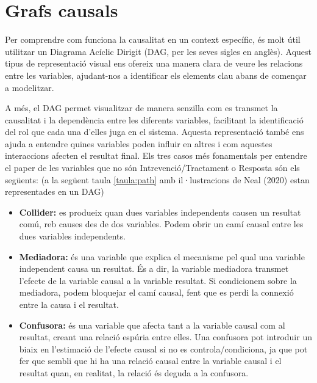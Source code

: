 \documentclass[../main.tex]{subfiles}
\begin{document}
    
    \section{Grafs causals}\label{sec:dag}
    Per comprendre com funciona la causalitat en un context específic, és molt útil utilitzar un Diagrama Acíclic Dirigit (DAG, per les seves sigles en anglès). Aquest tipus de representació visual ens ofereix una manera clara de veure les relacions entre les variables, ajudant-nos a identificar els elements clau abans de començar a modelitzar. \par
    A més, el DAG permet visualitzar de manera senzilla com es transmet la causalitat i la dependència entre les diferents variables, facilitant la identificació del rol que cada una d'elles juga en el sistema. Aquesta representació també ens ajuda a entendre quines variables poden influir en altres i com aquestes interaccions afecten el resultat final. Els tres casos més fonamentals per entendre el paper de les variables que no són Intrevenció/Tractament o Resposta són els següents: (a la següent taula \ref{taula:path} amb il·lustracions de Neal (2020) estan representades en un DAG)
    \begin{itemize}
        \item \textbf{Collider:} es produeix quan dues variables independents causen un resultat comú, reb causes des de dos variables. Podem obrir un camí causal entre les dues variables independents.
        \item \textbf{Mediadora:} és una variable que explica el mecanisme pel qual una variable independent causa un resultat. És a dir, la variable mediadora transmet l'efecte de la variable causal a la variable resultat. Si condicionem sobre la mediadora, podem bloquejar el camí causal, fent que es perdi la connexió entre la causa i el resultat.
        \item \textbf{Confusora:} és una variable que afecta tant a la variable causal com al resultat, creant una relació espúria entre elles. Una confusora pot introduir un biaix en l'estimació de l'efecte causal si no es controla/condiciona, ja que pot fer que sembli que hi ha una relació causal entre la variable causal i el resultat quan, en realitat, la relació és deguda a la confusora.
    \end{itemize}
\end{document}

